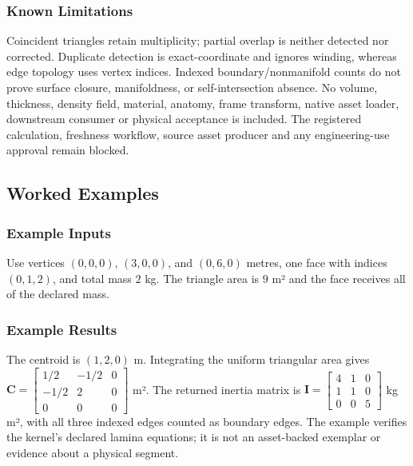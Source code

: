\documentclass[
  american,
]{article}
\begin{document}
\subsubsection{Known Limitations}\label{known-limitations-1}

Coincident triangles retain multiplicity; partial overlap is neither
detected nor corrected. Duplicate detection is exact-coordinate and
ignores winding, whereas edge topology uses vertex indices. Indexed
boundary/nonmanifold counts do not prove surface closure, manifoldness,
or self-intersection absence. No volume, thickness, density field,
material, anatomy, frame transform, native asset loader, downstream
consumer or physical acceptance is included. The registered calculation,
freshness workflow, source asset producer and any engineering-use
approval remain blocked.

\subsection{Worked Examples}\label{worked-examples-1}

\subsubsection{Example Inputs}\label{example-inputs-1}

Use vertices \((0,0,0)\), \((3,0,0)\), and \((0,6,0)\) metres, one face
with indices \((0,1,2)\), and total mass \(2\) kg. The triangle area is
\(9\) m² and the face receives all of the declared mass.

\subsubsection{Example Results}\label{example-results-1}

The centroid is \((1,2,0)\) m. Integrating the uniform triangular area
gives
\(\mathbf{C}=\begin{bmatrix}1/2&-1/2&0\\-1/2&2&0\\0&0&0\end{bmatrix}\)
m². The returned inertia matrix is
\(\mathbf{I}=\begin{bmatrix}4&1&0\\1&1&0\\0&0&5\end{bmatrix}\) kg m²,
with all three indexed edges counted as boundary edges. The example
verifies the kernel's declared lamina equations; it is not an
asset-backed exemplar or evidence about a physical segment.
\end{document}

